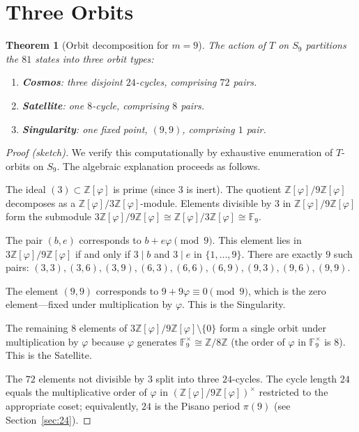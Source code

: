 \documentclass[11pt]{article}
\newtheorem{theorem}[definition]{Theorem}
\newcommand{\Zphi}{\mathbb{Z}[\varphi]}
\begin{document}
\section{Three Orbits}\label{sec:orbits}

\begin{theorem}[Orbit decomposition for $m=9$]\label{thm:orbits}
The action of $T$ on $S_9$ partitions the $81$ states into three orbit types:
\begin{enumerate}[label=(\roman*)]
  \item \textbf{Cosmos}: three disjoint $24$-cycles, comprising $72$ pairs.
  \item \textbf{Satellite}: one $8$-cycle, comprising $8$ pairs.
  \item \textbf{Singularity}: one fixed point, $(9,9)$, comprising $1$ pair.
\end{enumerate}
\end{theorem}

\begin{proof}[Proof (sketch)]
We verify this computationally by exhaustive enumeration of $T$-orbits on $S_9$.  The algebraic explanation proceeds as follows.

The ideal $(3) \subset \Zphi$ is prime (since $3$ is inert).  The quotient $\Zphi/9\Zphi$ decomposes as a $\Zphi/3\Zphi$-module.  Elements divisible by $3$ in $\Zphi/9\Zphi$ form the submodule $3\Zphi/9\Zphi \cong \Zphi/3\Zphi \cong \mathbb{F}_9$.

The pair $(b,e)$ corresponds to $b + e\varphi \pmod{9}$.  This element lies in $3\Zphi/9\Zphi$ if and only if $3 \mid b$ and $3 \mid e$ in $\{1,\dots,9\}$.  There are exactly $9$ such pairs: $(3,3), (3,6), (3,9), (6,3), (6,6), (6,9), (9,3), (9,6), (9,9)$.

The element $(9,9)$ corresponds to $9 + 9\varphi \equiv 0 \pmod{9}$, which is the zero element---fixed under multiplication by $\varphi$.  This is the Singularity.

The remaining $8$ elements of $3\Zphi/9\Zphi \setminus \{0\}$ form a single orbit under multiplication by $\varphi$ because $\varphi$ generates $\mathbb{F}_9^\times \cong \mathbb{Z}/8\mathbb{Z}$ (the order of $\varphi$ in $\mathbb{F}_9^\times$ is $8$).  This is the Satellite.

The $72$ elements not divisible by $3$ split into three $24$-cycles.  The cycle length $24$ equals the multiplicative order of $\varphi$ in $(\Zphi/9\Zphi)^\times$ restricted to the appropriate coset; equivalently, $24$ is the Pisano period $\pi(9)$ (see Section~\ref{sec:24}).
\end{proof}
\end{document}
